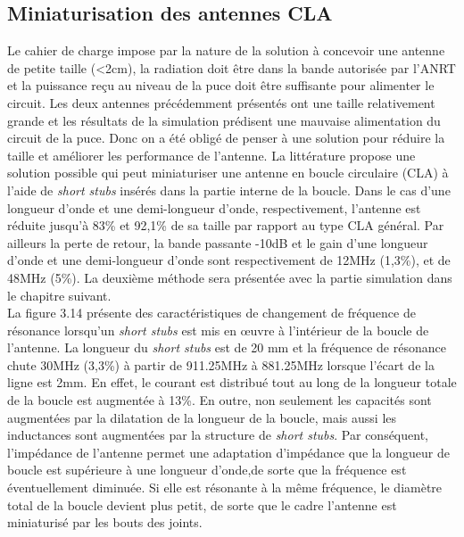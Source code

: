 \documentclass[11pt, a4paper, twoside]{book}
\begin{document}
\subsection{Miniaturisation des antennes CLA}
Le cahier de charge impose par la nature de la solution à concevoir une antenne de petite taille (<2cm), la radiation doit être dans la bande autorisée par l'ANRT et la puissance reçu au niveau de la puce doit être suffisante pour alimenter le circuit. Les deux antennes précédemment présentés ont une taille relativement grande et les résultats de la simulation prédisent une mauvaise alimentation du circuit de la puce. Donc on a été obligé de penser à une solution pour réduire la taille et améliorer les performance de l'antenne. La littérature \cite{stub}  propose une solution possible qui peut
miniaturiser une antenne en boucle circulaire (CLA) à l'aide de \emph{short stubs} insérés dans la partie interne de la boucle. Dans le cas d'une longueur d'onde et une demi-longueur d'onde, respectivement, l'antenne est réduite jusqu'à 83\% et 92,1\% de sa taille par rapport au type CLA général. Par ailleurs la perte de retour, la bande passante -10dB et le gain d'une longueur d'onde et une demi-longueur d'onde sont respectivement de 12MHz (1,3\%), et de 48MHz (5\%). La deuxième méthode sera présentée avec la partie simulation dans le chapitre suivant.\\

La figure 3.14 présente des caractéristiques de changement de fréquence de résonance lorsqu'un \emph{short stubs} est mis en œuvre à l'intérieur de la boucle de l'antenne. La longueur du  \emph{short stubs} est de 20 mm et la fréquence de résonance chute 30MHz (3,3\%) à partir de 911.25MHz à 881.25MHz lorsque l'écart de la ligne est 2mm. En effet, le courant est distribué tout au long de la longueur totale de la boucle est augmentée à 13\%. En outre, non seulement les capacités sont augmentées par la dilatation de la longueur de la boucle, mais aussi les inductances sont augmentées par la structure de \emph{short stubs}. Par conséquent, l'impédance de l'antenne permet une adaptation d'impédance que la longueur de boucle est supérieure à une longueur d'onde,de sorte que la fréquence est éventuellement diminuée. Si elle est résonante à la même fréquence, le diamètre total de la boucle devient plus petit, de sorte que le cadre l'antenne est miniaturisé par les bouts des joints.
\end{document}
